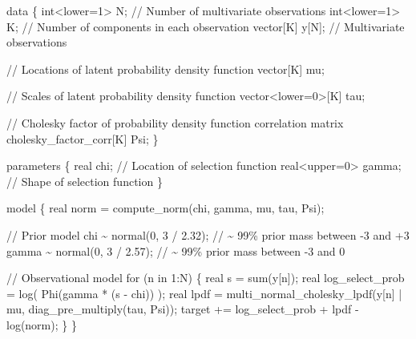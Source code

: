 \documentclass[
  letterpaper,
  DIV=11,
  numbers=noendperiod]{scrartcl}
\newenvironment{Shaded}{\begin{snugshade}}{\end{snugshade}}
\newcommand{\CommentTok}[1]{\textcolor[rgb]{0.37,0.37,0.37}{#1}}
\newcommand{\ControlFlowTok}[1]{\textcolor[rgb]{0.00,0.23,0.31}{#1}}
\newcommand{\DataTypeTok}[1]{\textcolor[rgb]{0.68,0.00,0.00}{#1}}
\newcommand{\DecValTok}[1]{\textcolor[rgb]{0.68,0.00,0.00}{#1}}
\newcommand{\FloatTok}[1]{\textcolor[rgb]{0.68,0.00,0.00}{#1}}
\newcommand{\KeywordTok}[1]{\textcolor[rgb]{0.00,0.23,0.31}{#1}}
\newcommand{\NormalTok}[1]{\textcolor[rgb]{0.00,0.23,0.31}{#1}}
\begin{document}
\begin{codelisting}
\begin{Shaded}
\begin{Highlighting}[]
\KeywordTok{data}\NormalTok{ \{}
  \DataTypeTok{int}\NormalTok{\textless{}}\KeywordTok{lower}\NormalTok{=}\DecValTok{1}\NormalTok{\textgreater{} N; }\CommentTok{// Number of multivariate observations}
  \DataTypeTok{int}\NormalTok{\textless{}}\KeywordTok{lower}\NormalTok{=}\DecValTok{1}\NormalTok{\textgreater{} K; }\CommentTok{// Number of components in each observation}
  \DataTypeTok{vector}\NormalTok{[K] y[N]; }\CommentTok{// Multivariate observations}
  
  \CommentTok{// Locations of latent probability density function}
  \DataTypeTok{vector}\NormalTok{[K] mu;}

  \CommentTok{// Scales of latent probability density function}
  \DataTypeTok{vector}\NormalTok{\textless{}}\KeywordTok{lower}\NormalTok{=}\DecValTok{0}\NormalTok{\textgreater{}[K] tau;}

  \CommentTok{// Cholesky factor of probability density function correlation matrix}
  \DataTypeTok{cholesky\_factor\_corr}\NormalTok{[K] Psi;}
\NormalTok{\}}

\KeywordTok{parameters}\NormalTok{ \{}
  \DataTypeTok{real}\NormalTok{ chi;            }\CommentTok{// Location of selection function}
  \DataTypeTok{real}\NormalTok{\textless{}}\KeywordTok{upper}\NormalTok{=}\DecValTok{0}\NormalTok{\textgreater{} gamma; }\CommentTok{// Shape of selection function}
\NormalTok{\}}

\KeywordTok{model}\NormalTok{ \{}
  \DataTypeTok{real}\NormalTok{ norm = compute\_norm(chi, gamma, mu, tau, Psi);}
  
  \CommentTok{// Prior model}
\NormalTok{  chi \textasciitilde{} normal(}\DecValTok{0}\NormalTok{, }\DecValTok{3}\NormalTok{ / }\FloatTok{2.32}\NormalTok{);   }\CommentTok{// \textasciitilde{} 99\% prior mass between {-}3 and +3}
\NormalTok{  gamma \textasciitilde{} normal(}\DecValTok{0}\NormalTok{, }\DecValTok{3}\NormalTok{ / }\FloatTok{2.57}\NormalTok{); }\CommentTok{// \textasciitilde{} 99\% prior mass between {-}3 and  0}
  
  \CommentTok{// Observational model}
  \ControlFlowTok{for}\NormalTok{ (n }\ControlFlowTok{in} \DecValTok{1}\NormalTok{:N) \{}
    \DataTypeTok{real}\NormalTok{ s = sum(y[n]);}
    \DataTypeTok{real}\NormalTok{ log\_select\_prob = log( Phi(gamma * (s {-} chi)) );}
    \DataTypeTok{real}\NormalTok{ lpdf = }
\NormalTok{      multi\_normal\_cholesky\_lpdf(y[n] | mu, diag\_pre\_multiply(tau, Psi));}
    \KeywordTok{target +=}\NormalTok{ log\_select\_prob + lpdf {-} log(norm);}
\NormalTok{  \}}
\NormalTok{\}}


\end{Highlighting}
\end{Shaded}
\end{codelisting}
\end{document}
